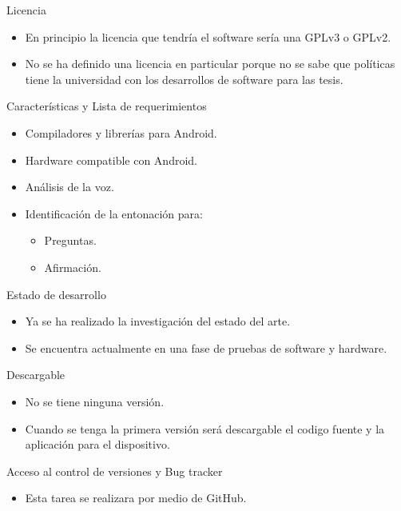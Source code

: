 \documentclass[pstricks, 12pt]{beamer}
\begin{document}
\begin{frame}{Licencia}
 \begin{itemize}
  \item En principio la licencia que tendría el software sería una GPLv3 o GPLv2.
  \item No se ha definido una licencia en particular porque no se sabe que políticas tiene la universidad con los desarrollos de software para las tesis.
 \end{itemize}
\end{frame}

\begin{frame}{Características y Lista de requerimientos}
 \begin{itemize}
  \item Compiladores y librerías para Android.
  \item Hardware compatible con Android.
  \item Análisis de la voz.
  \item Identificación de la entonación para:
  \begin{itemize}
   \item Preguntas.
   \item Afirmación.
  \end{itemize}
 \end{itemize}
\end{frame}

\begin{frame}{Estado de desarrollo}
 \begin{itemize}
  \item Ya se ha realizado la investigación del estado del arte.
  \item Se encuentra actualmente en una fase de pruebas de software y hardware.
 \end{itemize}
\end{frame}

\begin{frame}{Descargable}
 \begin{itemize}
  \item No se tiene ninguna versión.
  \item Cuando se tenga la primera versión será descargable el codigo fuente y la aplicación para el dispositivo.
 \end{itemize}
\end{frame}

\begin{frame}{Acceso al control de versiones y Bug tracker}
 \begin{itemize}
  \item Esta tarea se realizara por medio de GitHub.
 \end{itemize}
\end{frame}
\end{document}

